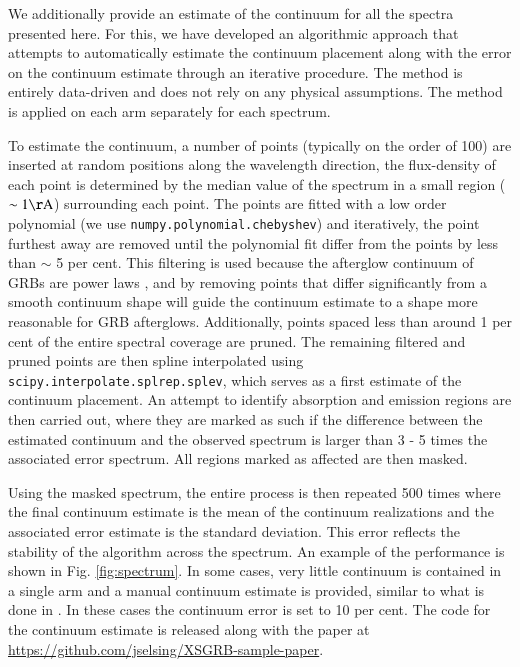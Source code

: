 \documentclass{aa}    %
\begin{document}
We additionally provide an estimate of the continuum for all the spectra
presented here. For this, we have developed an algorithmic approach that
attempts to automatically estimate the continuum placement along with the error on
the continuum estimate through an iterative procedure. The method is entirely
data-driven and does not rely on any physical assumptions. The method is applied on
each arm separately for each spectrum.

To estimate the continuum, a number of points (typically on the order of 100)
are inserted at random positions along the wavelength direction, the
flux-density of each point is determined by the median value of the spectrum in
a small region ($\sim 1 \mathrm{\AA}$) surrounding each point. The points are
fitted with a low order polynomial (we use \texttt{numpy.polynomial.chebyshev})
and iteratively, the point furthest away are removed until the polynomial fit
differ from the points by less than $\sim$ 5 per cent. This filtering is used
because the afterglow continuum of GRBs are power laws \citep{Piran2005}, and by
removing points that differ significantly from a smooth continuum shape will
guide the continuum estimate to a shape more reasonable for GRB afterglows.
Additionally, points spaced less than around 1 per cent of the entire spectral
coverage are pruned. The remaining filtered and pruned points are then spline
interpolated using \texttt{scipy.interpolate.splrep.splev}, which serves as a
first estimate of the continuum placement. An attempt to identify absorption and
emission regions are then carried out, where they are marked as such if the
difference between the estimated continuum and the observed spectrum is larger
than 3 - 5 times the associated error spectrum. All regions marked as affected
are then masked.

Using the masked spectrum, the entire process is then repeated 500 times where
the final continuum estimate is the mean of the continuum realizations and the
associated error estimate is the standard deviation. This error reflects the
stability of the algorithm across the spectrum. An example of the performance is
shown in Fig. \ref{fig:spectrum}. In some cases, very little continuum is
contained in a single arm and a manual continuum estimate is provided, similar
to what is done in \citet{Lopez2016}. In these cases the continuum error is set
to 10 per cent. The code for the continuum estimate is released along with the
paper at \url{https://github.com/jselsing/XSGRB-sample-paper}.
                                                                                           
\end{document}
